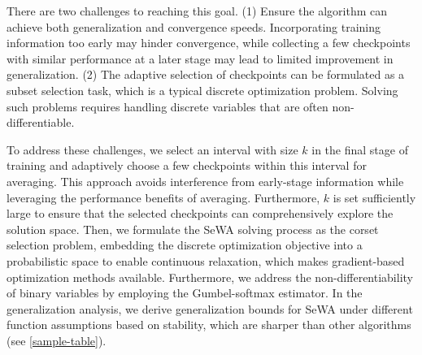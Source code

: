 There are two challenges to reaching this goal. 
(1) Ensure the algorithm can achieve both generalization and convergence speeds. Incorporating training information too early may hinder convergence, while collecting a few checkpoints with similar performance at a later stage may lead to limited improvement in generalization.
(2) The adaptive selection of checkpoints can be formulated as a subset selection task, which is a typical discrete optimization problem. Solving such problems requires handling discrete variables that are often non-differentiable.

To address these challenges, we select an interval with size $k$ in the final stage of training and adaptively choose a few checkpoints within this interval for averaging. This approach avoids interference from early-stage information while leveraging the performance benefits of averaging. Furthermore, $k$ is set sufficiently large to ensure that the selected checkpoints can comprehensively explore the solution space. Then, we formulate the SeWA solving process as the corset selection problem, embedding the discrete optimization objective into a probabilistic space to enable continuous relaxation, which makes gradient-based optimization methods available. Furthermore, we address the non-differentiability of binary variables by employing the Gumbel-softmax estimator. In the generalization analysis, we derive generalization bounds for SeWA under different function assumptions based on stability, which are sharper than other algorithms (see \cref{sample-table}). 

